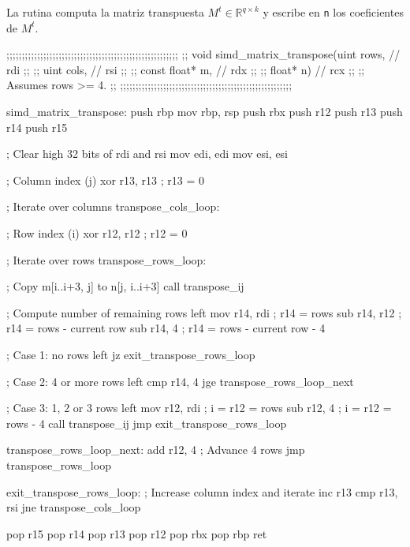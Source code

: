 \documentclass[a4paper, 10pt, twoside]{article}
\newcommand{\cc}[1]{\texttt{#1}}
\begin{document}
La rutina computa la matriz transpuesta $M^t \in \mathbb{R}^{q \times k}$ y
escribe en \cc{n} los coeficientes de $M^t$.

\begin{code}
  ;;;;;;;;;;;;;;;;;;;;;;;;;;;;;;;;;;;;;;;;;;;;;;;;;;;;;;;;
  ;; void simd_matrix_transpose(uint rows,       // rdi ;;
  ;;                            uint cols,       // rsi ;;
  ;;                            const float* m,  // rdx ;;
  ;;                            float* n)        // rcx ;;
  ;; Assumes rows >= 4.                                 ;;
  ;;;;;;;;;;;;;;;;;;;;;;;;;;;;;;;;;;;;;;;;;;;;;;;;;;;;;;;;

  simd_matrix_transpose:
    push rbp
    mov rbp, rsp
    push rbx
    push r12
    push r13
    push r14
    push r15

    ; Clear high 32 bits of rdi and rsi
    mov edi, edi
    mov esi, esi

    ; Column index (j)
    xor r13, r13             ; r13 = 0

    ; Iterate over columns
  transpose_cols_loop:

    ; Row index (i)
    xor r12, r12             ; r12 = 0

    ; Iterate over rows
  transpose_rows_loop:

    ; Copy m[i..i+3, j] to n[j, i..i+3]
    call transpose_ij

    ; Compute number of remaining rows left
    mov r14, rdi             ; r14 = rows
    sub r14, r12             ; r14 = rows - current row
    sub r14, 4               ; r14 = rows - current row - 4

    ; Case 1: no rows left
    jz exit_transpose_rows_loop

    ; Case 2: 4 or more rows left
    cmp r14, 4
    jge transpose_rows_loop_next

    ; Case 3: 1, 2 or 3 rows left
    mov r12, rdi             ; i = r12 = rows
    sub r12, 4               ; i = r12 = rows - 4
    call transpose_ij
    jmp exit_transpose_rows_loop

  transpose_rows_loop_next:
    add r12, 4               ; Advance 4 rows
    jmp transpose_rows_loop

  exit_transpose_rows_loop:
    ; Increase column index and iterate
    inc r13
    cmp r13, rsi
    jne transpose_cols_loop

    pop r15
    pop r14
    pop r13
    pop r12
    pop rbx
    pop rbp
    ret
\end{code}
\end{document}
